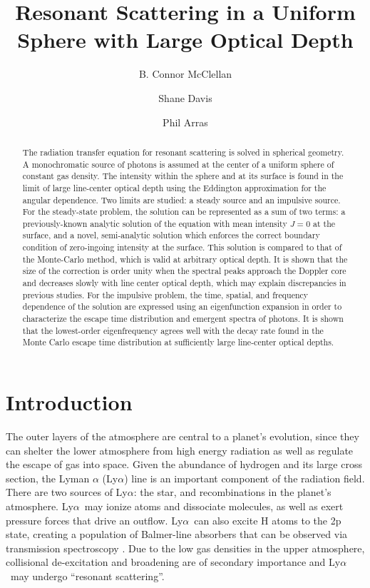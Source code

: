\documentclass[linenumbers]{aastex63}
\newcommand\lya{Ly$\alpha$\ }
\begin{document}
\title{Resonant Scattering in a Uniform Sphere with Large Optical Depth}


\author[0000-0002-6040-8281]{B. Connor McClellan}
\author[0000-0001-7488-4468]{Shane Davis}
\author[0000-0001-5611-1349]{Phil Arras}
\address{Department of Astronomy, University of Virginia, Charlottesville, VA 22904, USA}

\begin{abstract}
The radiation transfer equation for resonant scattering is solved in spherical geometry. A monochromatic source of photons is assumed at the center of a uniform sphere of constant gas density. The intensity within the sphere and at its surface is found in the limit of large line-center optical depth using the Eddington approximation for the angular dependence. Two limits are studied: a steady source and an impulsive source. For the steady-state problem, the solution can be represented as a sum of two terms: a previously-known analytic solution of the equation with  mean intensity $J=0$ at the surface, and a novel, semi-analytic solution which enforces the correct boundary condition of zero-ingoing intensity at the surface. This solution is compared to that of the Monte-Carlo method, which is valid at arbitrary optical depth. It is shown that the size of the correction is order unity when the spectral peaks approach the Doppler core and decreases slowly with line center optical depth, which may explain discrepancies in previous studies. For the impulsive problem, the time, spatial, and frequency dependence of the solution are expressed using an eigenfunction expansion in order to characterize the escape time distribution and emergent spectra of photons. It is shown that the lowest-order eigenfrequency agrees well with the decay rate found in the Monte Carlo escape time distribution at sufficiently large line-center optical depths.

\end{abstract}


\keywords{}

\section{Introduction}
\label{sec:intro}

The outer layers of the atmosphere are central to a planet's evolution, since they can shelter the lower atmosphere from high energy radiation as well as regulate the escape of gas into space. Given the abundance of hydrogen and its large cross section, the Lyman $\alpha$ (Ly$\alpha$) line is an important component of the radiation field. There are two sources of Ly$\alpha$: the star, and recombinations in the planet's atmosphere. \lya may ionize atoms and dissociate molecules, as well as exert pressure forces that drive an outflow. \lya can also excite H atoms to the 2p state, creating a population of Balmer-line absorbers that can be observed via transmission spectroscopy \citep{2017ApJ...851..150H}. Due to the low gas densities in the upper atmosphere, collisional de-excitation and broadening are of secondary importance and \lya may undergo ``resonant scattering''.
\end{document}
